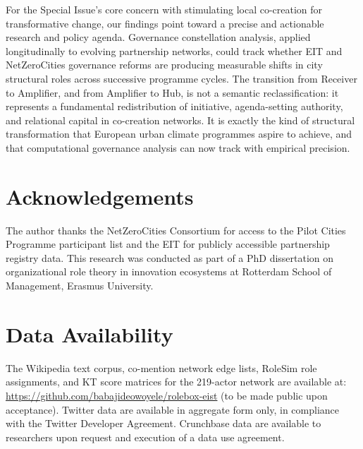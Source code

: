 \documentclass[review,12pt]{elsarticle}
\begin{document}
For the Special Issue's core concern with stimulating local co-creation for transformative change, our findings point toward a precise and actionable research and policy agenda. Governance constellation analysis, applied longitudinally to evolving partnership networks, could track whether EIT and NetZeroCities governance reforms are producing measurable shifts in city structural roles across successive programme cycles. The transition from Receiver to Amplifier, and from Amplifier to Hub, is not a semantic reclassification: it represents a fundamental redistribution of initiative, agenda-setting authority, and relational capital in co-creation networks. It is exactly the kind of structural transformation that European urban climate programmes aspire to achieve, and that computational governance analysis can now track with empirical precision.


\section*{Acknowledgements}

The author thanks the NetZeroCities Consortium for access to the Pilot Cities Programme participant list and the EIT for publicly accessible partnership registry data. This research was conducted as part of a PhD dissertation on organizational role theory in innovation ecosystems at Rotterdam School of Management, Erasmus University.


\section*{Data Availability}

The Wikipedia text corpus, co-mention network edge lists, RoleSim role assignments, and KT score matrices for the 219-actor network are available at: \url{https://github.com/babajideowoyele/rolebox-eist} (to be made public upon acceptance). Twitter data are available in aggregate form only, in compliance with the Twitter Developer Agreement. Crunchbase data are available to researchers upon request and execution of a data use agreement.

\end{document}
